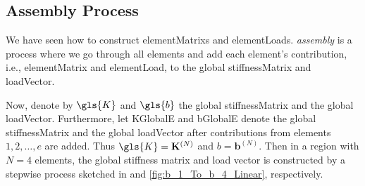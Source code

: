 \subsection{Assembly Process} \label{cha:Assembly_Process_Linear}
We have seen how to construct \glspl{elementMatrix} and \glspl{elementLoad}. \emph{\Gls{assembly}}
is a process where we go through all \glspl{element} and add each element's contribution, i.e., \gls{elementMatrix} and
\gls{elementLoad}, to the global \gls{stiffnessMatrix} and \gls{loadVector}.

Now, denote by $\gls{K}$ and $\gls{b}$ the global \gls{stiffnessMatrix} and the global \gls{loadVector}.
Furthermore, let \gls{KGlobalE} and \gls{bGlobalE} denote the global \gls{stiffnessMatrix} and the global \gls{loadVector}
after contributions from elements $1, 2, \dots, e$ are added. Thus $\gls{K} = \mathbf{K}^{ \left( N \right) }$ and
$b = \mathbf{b}^{\left( N \right)}$. Then in a \gls{region} with $N = 4$ \glspl{element}, the global
stiffness matrix and load vector is constructed by a stepwise process sketched in
 and \cref{fig:b_1_To_b_4_Linear}, respectively.
%

%